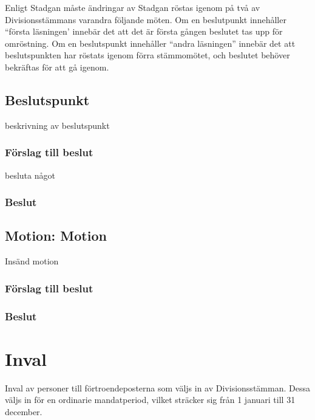 \documentclass[protokoll]{dvd}
\begin{document}
Enligt Stadgan måste ändringar av Stadgan röstas igenom på två av Divisionsstämmans varandra följande möten.
Om en beslutpunkt innehåller ``första läsningen' innebär det att det är första gången beslutet tas upp för omröstning.
Om en beslutspunkt innehåller ``andra läsningen'' innebär det att beslutspunkten har röstats igenom förra stämmomötet, och beslutet behöver bekräftas för att gå igenom.

\subsection*{Beslutspunkt}
beskrivning av beslutspunkt

\subsubsection*{Förslag till beslut}
\begin{attsatser}
    \item besluta något
\end{attsatser}

\subsubsection*{Beslut}
\begin{attsatser}
    \item 
\end{attsatser}


\subsection*{Motion: Motion}
Insänd motion


\subsubsection*{Förslag till beslut}
\begin{attsatser}
    \item 
\end{attsatser}

\subsubsection*{Beslut}
\begin{attsatser}
     \item 
\end{attsatser}

\newpage

\section{Inval}
Inval av personer till förtroendeposterna som väljs in av Divisionsstämman. Dessa väljs in för en ordinarie mandatperiod, vilket sträcker sig från 1 januari till 31 december.
\end{document}
